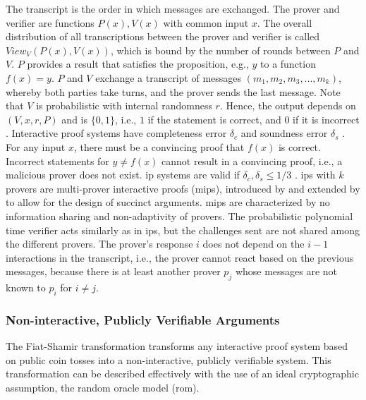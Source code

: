 The transcript is the order in which messages are exchanged. The prover and verifier are functions \(P(x), V(x)\) with common input \(x\). The overall distribution of all transcriptions between the prover and verifier is called \(View_V(P(x), V(x))\), which is bound by the number of rounds between \(P\) and \(V\). \(P\) provides a result that satisfies the proposition, e.g., \(y\) to a function \(f(x) = y\). \(P\) and \(V\) exchange a transcript of messages \((m_1, m_2, m_3, ..., m_k)\), whereby both parties take turns, and the prover sends the last message. Note that \(V\) is probabilistic with internal randomness \(r\). Hence, the output depends on \((V, x, r, P)\) and is \(\{0,1\}\), i.e., \(1\) if the statement is correct, and \(0\) if it is incorrect \citep{GoldwasserIPs, BabaiIPs}. Interactive proof systems have completeness error \(\delta_c\) and soundness error \(\delta_s\) . For any input \(x\), there must be a convincing proof that \(f(x)\) is correct. Incorrect statements for \(y \neq f(x)\) cannot result in a convincing proof, i.e., a malicious prover does not exist. \acrshort{ip} systems are valid if \(\delta_c, \delta_s \leq 1/3\) \citep{Thaler}. \acrshort{ip}s with \(k\) provers are multi-prover interactive proofs (\acrshort{mip}s), introduced by \citet{MIPsBen} and extended by \citet{MIPsSetty} to allow for the design of succinct arguments. \acrshort{mip}s are characterized by no information sharing and non-adaptivity of provers. The probabilistic polynomial time verifier acts similarly as in \acrshort{ip}s, but the challenges sent are not shared among the different provers. The prover's response \(i\) does not depend on the \(i-1\) interactions in the transcript, i.e., the prover cannot react based on the previous messages, because there is at least another prover \(p_j\) whose messages are not known to \(p_i\) for \(i\neq j\).

\subsubsection{Non-interactive, Publicly Verifiable Arguments}
The Fiat-Shamir transformation transforms any interactive proof system based on public coin tosses into a non-interactive, publicly verifiable system. This transformation can be described effectively with the use of an ideal cryptographic assumption, the random oracle model (\acrshort{rom}). 
